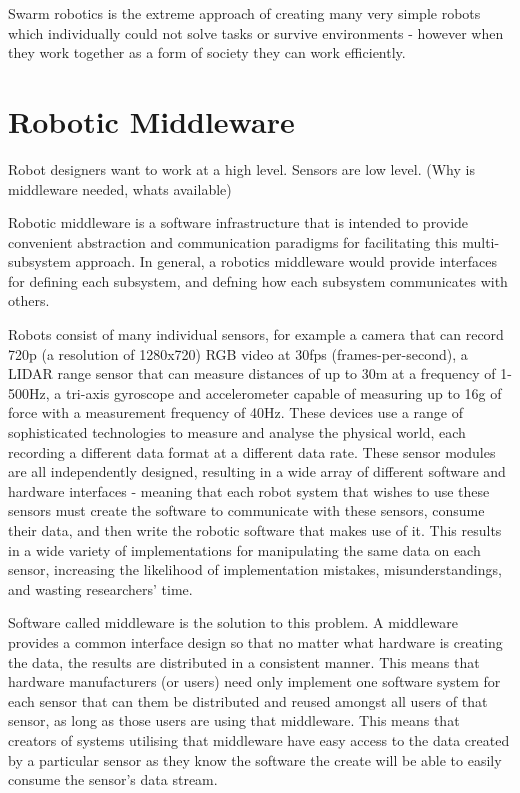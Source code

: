 \documentclass[../dissertation.tex]{subfiles}
\begin{document}
Swarm robotics is the extreme approach of creating many very simple robots which individually could not solve tasks or survive environments - however when they work together as a form of society they can work efficiently.

\section{Robotic Middleware}

Robot designers want to work at a high level. Sensors are low level. (Why is middleware needed, whats available)

Robotic middleware is a software infrastructure that is intended to provide convenient abstraction and communication paradigms for facilitating this multi-subsystem approach. In general, a robotics middleware would provide interfaces for defining each subsystem, and defning how each subsystem communicates with others.

Robots consist of many individual sensors, for example a camera that can record 720p (a resolution of 1280x720) RGB video at 30fps (frames-per-second), a LIDAR range sensor that can measure distances of up to 30m at a frequency of 1-500Hz, a tri-axis gyroscope and accelerometer capable of measuring up to 16g of force with a measurement frequency of 40Hz. These devices use a range of sophisticated technologies to measure and analyse the physical world, each recording a different data format at a different data rate. These sensor modules are all independently designed, resulting in a wide array of different software and hardware interfaces - meaning that each robot system that wishes to use these sensors must create the software to communicate with these sensors, consume their data, and then write the robotic software that makes use of it. This results in a wide variety of implementations for manipulating the same data on each sensor, increasing the likelihood of implementation mistakes, misunderstandings, and wasting researchers' time.

Software called middleware is the solution to this problem. A middleware provides a common interface design so that no matter what hardware is creating the data, the results are distributed in a consistent manner. This means that hardware manufacturers (or users) need only implement one software system for each sensor that can them be distributed and reused amongst all users of that sensor, as long as those users are using that middleware. This means that creators of systems utilising that middleware have easy access to the data created by a particular sensor as they know the software the create will be able to easily consume the sensor's data stream.
\end{document}
